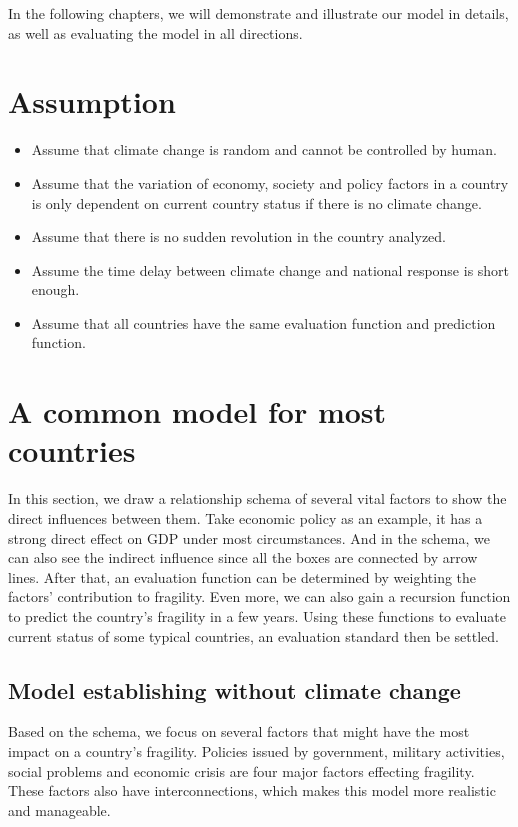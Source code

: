 \documentclass{mcmthesis}
\begin{document}
In the following chapters, we will demonstrate and illustrate our model in details, as well as evaluating the model in all directions.

\section{Assumption}

\begin{itemize}
\item Assume that climate change is random and cannot be controlled by human.

\item Assume that the variation of economy, society and policy factors in a country is only dependent on current country status if there is no climate change.

\item Assume that there is no sudden revolution in the country analyzed.

\item Assume the time delay between climate change and national response is short enough.

\item Assume that all countries have the same evaluation function and prediction function.

\end{itemize}

\section{A common model for most countries}
In this section, we draw a relationship schema of several vital factors to show the direct influences between them. Take economic policy as an example, it has a strong direct effect on GDP under most circumstances. And in the schema, we can also see the indirect influence since all the boxes are connected by arrow lines. After that, an evaluation function can be determined by weighting the factors’ contribution to fragility. Even more, we can also gain a recursion function to predict the country’s fragility in a few years. Using these functions to evaluate current status of some typical countries, an evaluation standard then be settled.

\subsection{Model establishing without climate change}
Based on the schema, we focus on several factors that might have the most impact on a country’s fragility. Policies issued by government, military activities, social problems and economic crisis are four major factors effecting fragility. These factors also have interconnections, which makes this model more realistic and manageable.
\end{document}
